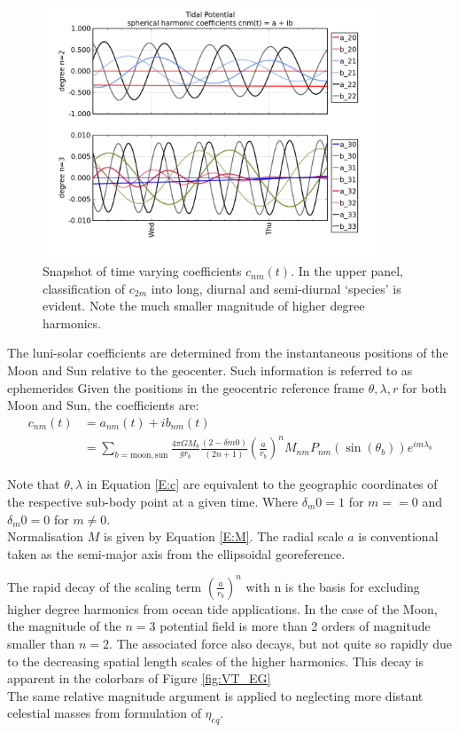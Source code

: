 \begin{figure}[h]
\begin{center}
\includegraphics[width=100mm]{figures/plots/tidal_coeff_timeseries_2days.png}
\caption{Snapshot of time varying coefficients $c_{nm}(t)$.  In the upper panel, classification of $c_{2m}$ into long, diurnal and semi-diurnal `species' is evident.  Note the much smaller magnitude of higher degree harmonics.}
\end{center}
\end{figure}

The luni-solar coefficients are determined from the instantaneous positions of the Moon and Sun relative to the geocenter.  Such information is referred to as ephemerides \citep[Section 8.1]{Urban:2013vl}
Given the positions in the geocentric reference frame $\theta,\lambda,r$ for both Moon and Sun, the coefficients are:
\begin{align}
\label{E:c}
c_{nm}(t) &= a_{nm}(t) + ib_{nm}(t) \nonumber \\
          &= \sum_{b=\text{moon},\text{sun}}    \frac{4 \pi GM_{b}}{g r_{b}}  \frac{(2-\delta{m0})} {(2n+1)} \left(\frac{a}{r_b} \right)^n    M_{nm} P_{nm}( \sin(\theta_b) ) e^{im\lambda_b}
\end{align}

Note that $\theta,\lambda$ in Equation \ref{E:c} are equivalent to the geographic coordinates of the respective sub-body point at a given time. 
Where $\delta_m0 = 1$ for $m==0$ and $\delta_m0 = 0$ for $m \neq 0$.\\
Normalisation $M$ is given by Equation \ref{E:M}. The radial scale $a$ is conventional taken as the semi-major axis from the ellipsoidal georeference. 



The rapid decay of the scaling term $\left(\frac{a}{r_b} \right)^n$ with n is the basis for excluding higher degree harmonics from ocean tide applications.  In the case of the Moon, the magnitude of the $n=3$ potential field is more than 2 orders of magnitude smaller than $n=2$.  The associated force also decays, but not quite so rapidly due to the decreasing spatial length scales of the higher harmonics.  This decay is apparent in the colorbars of Figure \ref{fig:VT_EG}\\
The same relative magnitude argument is applied to neglecting more distant celestial masses from formulation of $\eta_{eq}$.



